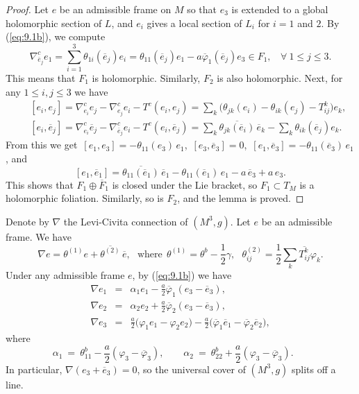 \documentclass{amsart}
\numberwithin{equation}{section}
\theoremstyle{definition}
\renewcommand{\1}{\mathds{1}}
\renewcommand{\>}{\rightarrow}
\begin{document}
\begin{proof}
Let $e$ be an admissible frame on $M$ so that $e_3$ is extended to a global holomorphic section of $L$, and $e_i$ gives a local section of $L_i$ for $i=1$ and $2$. By (\ref{eq:9.1b}), we compute
$$ \nabla^c_{\overline{e}_j} e_1 = \sum_{i=1}^3 \theta_{1i}(\overline{e}_j)e_i = \theta_{11}(\overline{e}_j)e_1 -a \overline{\varphi}_1(\overline{e}_j)e_3 \in F_1, \ \ \ \ \forall \ 1\leq j\leq 3.$$
This means that $F_1$ is holomorphic. Similarly, $F_2$ is also holomorphic. Next, for any $1\leq i,j\leq 3$ we have
\begin{eqnarray*}
 && [e_i, e_j] = \nabla^c_{e_i}e_j -  \nabla^c_{e_j}e_i -T^c(e_i,e_j) = \sum_{k} \big(\theta_{jk}(e_i) - \theta_{ik}(e_j) - T^k_{ij} \big) e_k ,\\
 && [e_i, \overline{e}_j] = \nabla^c_{e_i}\overline{e}_j -  \nabla^c_{\overline{e}_j}e_i -T^c(e_i,\overline{e}_j) = \sum_{k} \overline{\theta_{jk}(\overline{e}_i)} \, \overline{e}_k  - \sum_k \theta_{ik}(\overline{e}_j)  e_k.
 \end{eqnarray*}
From this we get $\,[e_1,e_3]=-\theta_{11}\!(e_3)\,e_1$, $\,[e_3, \overline{e}_3]=0$, $\, [e_1, \overline{e}_3]=-\theta_{11}\!(\overline{e}_3)\,e_1$, and
$$ [e_1, \overline{e}_1] = \overline{\theta_{11}(\overline{e}_1)}\,\overline{e}_1  - \theta_{11}(\overline{e}_1)\,e_1  - a \,\overline{e}_3 + a \,e_3. $$
This shows that $F_1\oplus \overline{F}_1$ is closed under the Lie bracket, so $F_1\subset T_{\!M}$ is a holomorphic foliation. Similarly, so is $F_2$, and the lemma is proved.
\end{proof}



Denote by $\nabla$ the Levi-Civita connection of $(M^3,g)$. Let $e$ be an admissible frame. We have
$$\nabla e = \theta^{(1)}e+\overline{\theta^{(2)}}\,\overline{e}, \ \ \ \mbox{where}  \ \ \theta^{(1)}=\theta^b -\frac{1}{2}\gamma, \ \ \ \theta^{(2)}_{ij} = \frac{1}{2}\sum_k\overline{T^k_{ij}} \varphi_k. $$
Under any admissible frame $e$, by (\ref{eq:9.1b}) we have
\begin{eqnarray} \label{eq:LeviCivitab}
\nabla e_1 & = &  \alpha_1 e_1 - \frac{a}{2}\overline{\varphi}_1 (e_3 - \overline{e}_3), \label{eq:9A}\\
\nabla e_2 & = &  \alpha_2 e_2 + \frac{a}{2}\overline{\varphi}_2 (e_3 - \overline{e}_3), \label{eq:9B} \\
\nabla e_3 & = &  \frac{a}{2} \big( \varphi_1e_1-\varphi_2e_2 \big)
- \frac{a}{2} \big( \overline{\varphi}_1 \overline{e}_1 - \overline{\varphi}_2 \overline{e}_2 \big) , \label{eq:9C}
\end{eqnarray}
where
$$ \alpha_1 \ = \  \theta^b_{11} - \frac{a}{2}(\varphi_3 - \overline{\varphi}_3), \ \ \ \ \ \ \ \ \
\alpha_2 \ = \ \theta^b_{22} + \frac{a}{2}(\varphi_3 - \overline{\varphi}_3).  \ \ \ \ \ \ \  $$
In particular, $\nabla (e_3+\overline{e}_3)=0$, so the universal cover of $(M^3,g)$ splits off a line.
\end{document}
